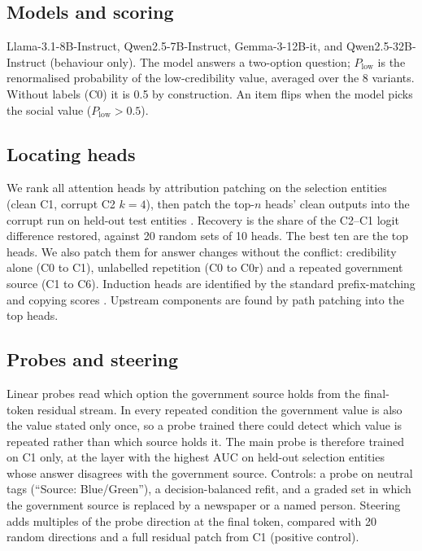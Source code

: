 \documentclass[11pt]{article}
\begin{document}
\subsection{Models and scoring}
Llama-3.1-8B-Instruct, Qwen2.5-7B-Instruct, Gemma-3-12B-it, and Qwen2.5-32B-Instruct (behaviour only). The model answers a two-option question; $P_{\text{low}}$ is the renormalised probability of the low-credibility value, averaged over the 8 variants. Without labels (C0) it is 0.5 by construction. An item flips when the model picks the social value ($P_{\text{low}} > 0.5$).

\subsection{Locating heads}
We rank all attention heads by attribution patching \citep{nanda2023attribution,syed2024attribution} on the selection entities (clean C1, corrupt C2 $k{=}4$), then patch the top-$n$ heads' clean outputs into the corrupt run on held-out test entities \citep{zhang2024bestpractices,heimersheim2024patching}. Recovery is the share of the C2--C1 logit difference restored, against 20 random sets of 10 heads. The best ten are the top heads. We also patch them for answer changes without the conflict: credibility alone (C0 to C1), unlabelled repetition (C0 to C0r) and a repeated government source (C1 to C6). Induction heads are identified by the standard prefix-matching and copying scores \citep{olsson2022induction}. Upstream components are found by path patching into the top heads.

\subsection{Probes and steering}
Linear probes read which option the government source holds from the final-token residual stream. In every repeated condition the government value is also the value stated only once, so a probe trained there could detect which value is repeated rather than which source holds it. The main probe is therefore trained on C1 only, at the layer with the highest AUC on held-out selection entities whose answer disagrees with the government source. Controls: a probe on neutral tags (``Source: Blue/Green''), a decision-balanced refit, and a graded set in which the government source is replaced by a newspaper or a named person. Steering adds multiples of the probe direction at the final token, compared with 20 random directions and a full residual patch from C1 (positive control).
\end{document}
